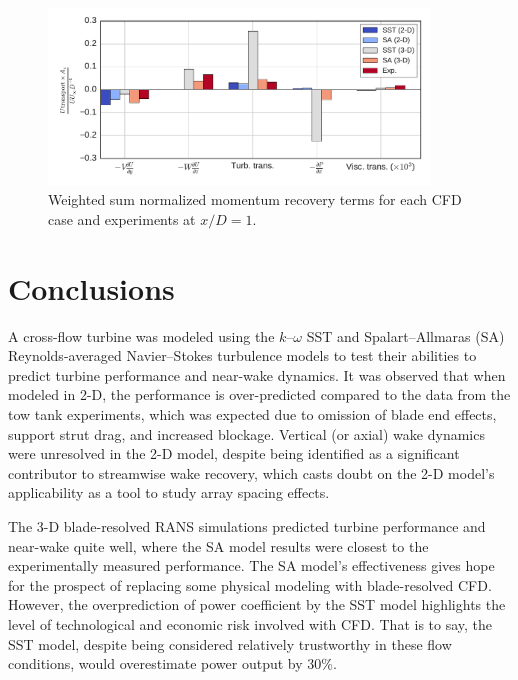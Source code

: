 \documentclass[aip,graphicx]{revtex4-1}
\begin{document}
\begin{figure}
    \centering

    \includegraphics[width=0.9\textwidth]{mom_bar_graph}

    \caption{Weighted sum normalized momentum recovery terms for each CFD case
        and experiments\cite{Bachant2016-RVAT-Re-dep} at $x/D=1$.}

    \label{fig:br-cfd-recovery}
\end{figure}


\section{Conclusions}

A cross-flow turbine was modeled using the $k$--$\omega$ SST and
Spalart--Allmaras (SA) Reynolds-averaged Navier--Stokes turbulence models to
test their abilities to predict turbine performance and near-wake dynamics. It
was observed that when modeled in 2-D, the performance is over-predicted
compared to the data from the tow tank experiments, which was expected due to
omission of blade end effects, support strut drag, and increased blockage.
Vertical (or axial) wake dynamics were unresolved in the 2-D model, despite
being identified as a significant contributor to streamwise wake recovery, which
casts doubt on the 2-D model's applicability as a tool to study array spacing
effects.

The 3-D blade-resolved RANS simulations predicted turbine performance and
near-wake quite well, where the SA model results were closest to the
experimentally measured performance. The SA model's effectiveness gives hope for
the prospect of replacing some physical modeling with blade-resolved CFD.
However, the  overprediction of power coefficient by the SST model highlights
the level of technological and economic risk involved with CFD. That is to say,
the SST model, despite being considered relatively trustworthy in these flow
conditions, would overestimate power output by 30\%.
\end{document}
